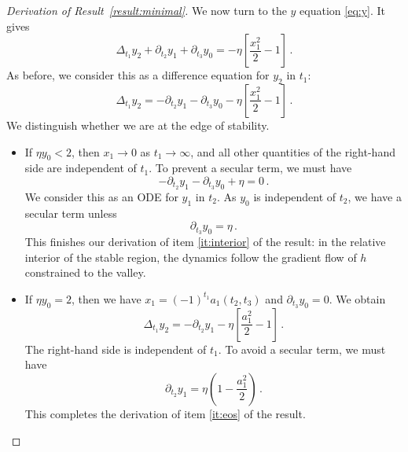 \documentclass[11pt,english,reqno]{article}
\theoremstyle{plain}
\theoremstyle{definition}
\theoremstyle{remark}
\numberwithin{equation}{section}
\begin{document}
\begin{proof}[Derivation of Result~\ref{result:minimal}]
We now turn to the $y$ equation \eqref{eq:y}. It gives
\begin{equation*}
    \Delta_{t_1} y_2 + \partial_{t_2} y_1 + \partial_{t_3} y_0 = - \eta \left[\frac{x_1^2}{2} - 1\right] \, .
\end{equation*}
As before, we consider this as a difference equation for $y_2$ in $t_1$: 
\begin{equation*}
    \Delta_{t_1} y_2  = - \partial_{t_2} y_1 - \partial_{t_3} y_0- \eta \left[\frac{x_1^2}{2} - 1\right] \, .
\end{equation*}
We distinguish whether we are at the edge of stability. 
\begin{itemize}
    \item If $\eta y_0 < 2$, then $x_1 \to 0$ as $t_1 \to \infty$, and all other quantities of the right-hand side are independent of $t_1$. To prevent a secular term, we must have 
    \begin{equation*}
        - \partial_{t_2} y_1 - \partial_{t_3} y_0 + \eta = 0 \, .
    \end{equation*}
    We consider this as an ODE for $y_1$ in $t_2$. As $y_0$ is independent of $t_2$, we have a secular term unless 
    \begin{equation*}
        \partial_{t_3} y_0 = \eta \, . 
    \end{equation*}
This finishes our derivation of item \ref{it:interior} of the result: in the relative interior of the stable region, the dynamics follow the gradient flow of $h$ constrained to the valley.
    \item If $\eta y_0 = 2$, then we have $x_1 = (-1)^{t_1} a_1(t_2, t_3)$ and $\partial_{t_3} y_0 = 0$. We obtain
    \begin{equation*}
        \Delta_{t_1} y_2  = - \partial_{t_2} y_1 - \eta \left[\frac{a_1^2}{2} - 1\right] \, .
    \end{equation*}
    The right-hand side is independent of $t_1$. To avoid a secular term, we must have 
    \begin{equation*}
        \partial_{t_2} y_1 = \eta \left(1 - \frac{a_1^2}{2}\right) \, .
    \end{equation*}
    This completes the derivation of item \ref{it:eos} of the result. 
\end{itemize}
\end{proof}
\end{document}
